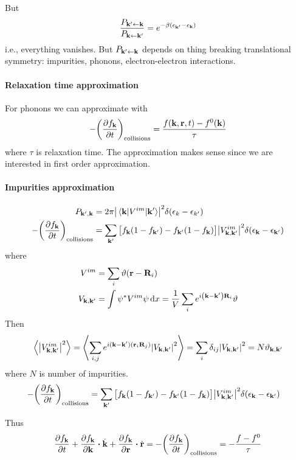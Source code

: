 But
\begin{align}
\frac{P_{\vb{k}'\leftarrow \vb{k}}}{P_{\vb{k} \leftarrow \vb{k}'}} = e^{-\beta(\epsilon_{\vb{k}'} - \epsilon_{\vb{k}})}
\end{align}
i.e., everything vanishes. But $P_{\vb{k}'\leftarrow \vb{k}}$ depends on thing breaking translational symmetry:  impurities, phonons, electron-electron interactions.

\paragraph{Relaxation time approximation}
For phonons we can approximate with
\begin{align}
-\qty(\pdv{f_{\vb{k}}}{t})_{\text{collisions}} = \frac{f(\vb{k},\vb{r},t) - f^0(\vb{k})}{\tau}
\end{align}
where $\tau$ is relaxation time. The approximation makes sense since we are interested in first order approximation.
\paragraph{Impurities approximation}
\begin{align}
P_{\vb{k}', \vb{k}} &= 2\pi \abs{\mel{\vb{k}}{V^{im}}{\vb{k}'}}^2 \delta(\epsilon_k - \epsilon_{k'})\\
-\qty(\pdv{f_{\vb{k}}}{t})_{\text{collisions}} &= \sum_{\vb{k}'} \qty\big[f_{\vb{k}}(1-f_{\vb{k}'}) -f_{\vb{k}'}(1-f_{\vb{k}}) ]\abs{V^{im}_{\vb{k},\vb{k}'}}^2 \delta\qty(\epsilon_{\vb{k}}-\epsilon_{\vb{k}'})
\end{align}
where
\begin{align}
V^{im} &= \sum_i \vartheta(\vb{r}-\vb{R}_i)\\
V_{\vb{k}, \vb{k}'} &= \int \psi^* V^{im} \psi \dd{x} = \frac{1}{V} \sum_i e^{i\qty(\vb{k}-\vb{k}')\vb{R}_i}\vartheta
\end{align}
Then
\begin{align}
\expval{\abs{V^{im}_{\vb{k},\vb{k}'}}^2} = \expval{\sum_{i,j} e^{i(\vb{k}-\vb{k'})(\vb{r}_i\vb{R}_j)}\abs{V_{\vb{k}, \vb{k}'} }^2 } = \sum_{i} \delta_{ij} \abs{V_{\vb{k}, \vb{k}'} }^2 = N \vartheta_{\vb{k}, \vb{k}'}  
\end{align}
where $N$ is number of impurities.
\begin{align}
-\qty(\pdv{f_{\vb{k}}}{t})_{\text{collisions}} &= \sum_{\vb{k}'} \qty\big[f_{\vb{k}}(1-f_{\vb{k}'}) -f_{\vb{k}'}(1-f_{\vb{k}}) ]\abs{V^{im}_{\vb{k},\vb{k}'}}^2 \delta\qty(\epsilon_{\vb{k}}-\epsilon_{\vb{k}'})
\end{align}

Thus
\begin{align}
 \pdv{f_{\vb{k}}}{t} + \pdv{f_{\vb{k}}}{\vb{k}} \vdot \dot{\vb{k}} + \pdv{f_{\vb{k}}}{\vb{r}} \vdot \dot{\vb{r}}  = -\qty(\pdv{f_{\vb{k}}}{t})_{\text{collisions}} = -\frac{f-f^0}{\tau}
\end{align}
